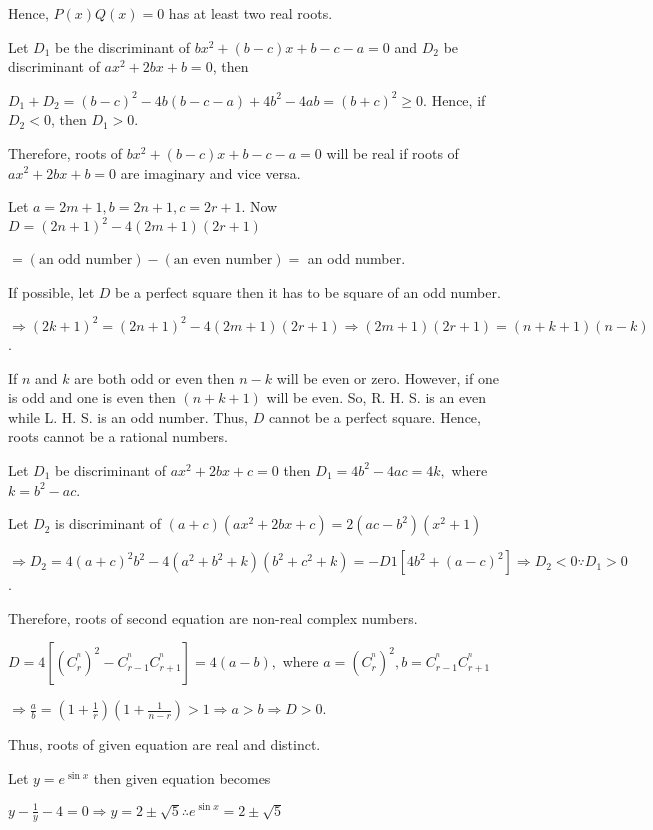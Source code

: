   Hence, $P(x)Q(x) = 0$ has at least two real roots.
\item Let $D_1$ be the discriminant of $bx^2 + (b - c)x + b - c - a = 0$ and $D_2$ be discriminant of
  $ax^2 + 2bx + b = 0$, then

  $D_1 + D_2 = (b - c)^2 - 4b(b - c - a) + 4b^2 - 4ab = (b + c)^2 \ge 0$. Hence, if $D_2 < 0$, then $D_1 >
  0$.

  Therefore, roots of $bx^2 + (b - c)x + b - c - a = 0$ will be real if roots of $ax^2 + 2bx + b = 0$ are
  imaginary and vice versa.
\item Let $a = 2m + 1, b = 2n + 1, c = 2r + 1$. Now $D = (2n + 1)^2 - 4(2m + 1)(2r + 1)$

  $= (\text{an odd number}) - (\text{an even number}) =$ an odd number.

  If possible, let $D$ be a perfect square then it has to be square of an odd number.

  $\Rightarrow (2k + 1)^2 = (2n + 1)^2 - 4(2m + 1)(2r + 1)\Rightarrow (2m + 1)(2r + 1) = (n + k + 1)(n - k)$.

  If $n$ and $k$ are both odd or even then $n - k$ will be even or zero. However, if one is odd and
  one is even then $(n + k + 1)$ will be even. So, R. H. S. is an even while L. H. S. is an odd number. Thus,
  $D$ cannot be a perfect square. Hence, roots cannot be a rational numbers.
\item Let $D_1$ be discriminant of $ax^2 + 2bx + c = 0$ then $D_1 = 4b^2 - 4ac = 4k,$ where $k = b^2 - ac$.

  Let $D_2$ is discriminant of $(a + c)(ax^2 + 2bx + c) = 2(ac - b^2)(x^2 + 1)$

  $\Rightarrow D_2 = 4(a + c)^2b^2 - 4(a^2 + b^2 + k)(b^2 + c^2 + k) = -D1[4b^2 + (a - c)^2] \Rightarrow D_2
  < 0 \because D_1 > 0$.

  Therefore, roots of second equation are non-real complex numbers.
\item $D = 4[(C_r^^n)^2 - C_{r - 1}^^nC_{r + 1}^^n] = 4(a - b),$ where $a = (C_r^^n)^2, b = C_{r - 1}^^nC_{r
  + 1}^^n$

  $\Rightarrow \frac{a}{b} = \left(1 + \frac{1}{r}\right)\left(1 + \frac{1}{n - r}\right) > 1\Rightarrow a >
  b \Rightarrow D > 0$.

  Thus, roots of given equation are real and distinct.
\item Let $y = e^{\sin x}$ then given equation becomes

  $y - \frac{1}{y} - 4 = 0\Rightarrow y = 2\pm \sqrt{5} \therefore e^{\sin x} = 2 \pm \sqrt{5}$

